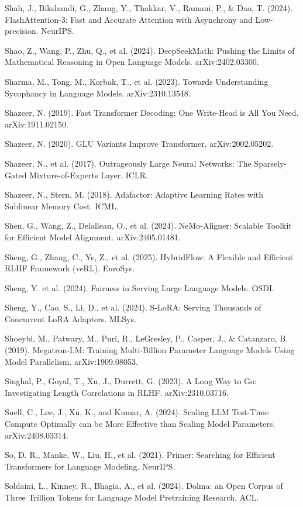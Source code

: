 {\begin{enumerate}[leftmargin=*,itemsep=1pt,label={[\arabic*]}]
\item Shah, J., Bikshandi, G., Zhang, Y., Thakkar, V., Ramani, P., \& Dao, T. (2024). FlashAttention-3: Fast and Accurate Attention with Asynchrony and Low-precision. NeurIPS.
\item Shao, Z., Wang, P., Zhu, Q., et al. (2024). DeepSeekMath: Pushing the Limits of Mathematical Reasoning in Open Language Models. arXiv:2402.03300.
\item Sharma, M., Tong, M., Korbak, T., et al. (2023). Towards Understanding Sycophancy in Language Models. arXiv:2310.13548.
\item Shazeer, N. (2019). Fast Transformer Decoding: One Write-Head is All You Need. arXiv:1911.02150.
\item Shazeer, N. (2020). GLU Variants Improve Transformer. arXiv:2002.05202.
\item Shazeer, N., et al. (2017). Outrageously Large Neural Networks: The Sparsely-Gated Mixture-of-Experts Layer. ICLR.
\item Shazeer, N., Stern, M. (2018). Adafactor: Adaptive Learning Rates with Sublinear Memory Cost. ICML.
\item Shen, G., Wang, Z., Delalleau, O., et al. (2024). NeMo-Aligner: Scalable Toolkit for Efficient Model Alignment. arXiv:2405.01481.
\item Sheng, G., Zhang, C., Ye, Z., et al. (2025). HybridFlow: A Flexible and Efficient RLHF Framework (veRL). EuroSys.
\item Sheng, Y. et al. (2024). Fairness in Serving Large Language Models. OSDI.
\item Sheng, Y., Cao, S., Li, D., et al. (2024). S-LoRA: Serving Thousands of Concurrent LoRA Adapters. MLSys.
\item Shoeybi, M., Patwary, M., Puri, R., LeGresley, P., Casper, J., \& Catanzaro, B. (2019). Megatron-LM: Training Multi-Billion Parameter Language Models Using Model Parallelism. arXiv:1909.08053.
\item Singhal, P., Goyal, T., Xu, J., Durrett, G. (2023). A Long Way to Go: Investigating Length Correlations in RLHF. arXiv:2310.03716.
\item Snell, C., Lee, J., Xu, K., and Kumar, A. (2024). Scaling LLM Test-Time Compute Optimally can be More Effective than Scaling Model Parameters. arXiv:2408.03314.
\item So, D. R., Manke, W., Liu, H., et al. (2021). Primer: Searching for Efficient Transformers for Language Modeling. NeurIPS.
\item Soldaini, L., Kinney, R., Bhagia, A., et al. (2024). Dolma: an Open Corpus of Three Trillion Tokens for Language Model Pretraining Research. ACL.

\end{enumerate}}
